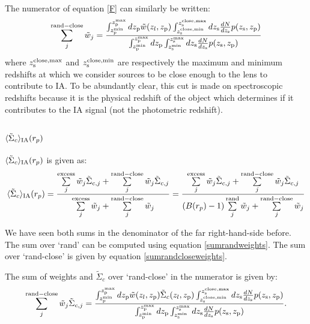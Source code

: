 \documentclass[onecolumn,amsmath,aps,fleqn, superscriptaddress]{revtex4}
\begin{document}
The numerator of equation \ref{F} can similarly be written:
\begin{equation}
\sum\limits_{j}^{\rm rand-close}\tilde{w}_j = \frac{\int_{z_{\rm p}^{\rm min}}^{z_{\rm p}^{\rm max}} d z_{\rm p} \tilde{w}(z_l, z_{\rm p}) \int_{z_{\rm s}^{\rm close, min}}^{z_{\rm s}^{\rm close, max}} dz_{\rm s} \frac{dN}{dz_{\rm s}} p(z_{\rm s}, z_{\rm p})}{\int_{z_{\rm p}^{\rm min}}^{z_{\rm p}^{\rm max}} d z_{\rm p} \int_{z_{\rm s}^{\rm min}}^{z_{\rm s}^{\rm max}} dz_{\rm s} \frac{dN}{dz_{\rm s}} p(z_{\rm s}, z_{\rm p})}
\label{sumrandcloseweights}
\end{equation}
where $z_{\rm s}^{\rm close,max}$ and $z_{\rm s}^{\rm close,min}$ are respectively the maximum and minimum redshifts at which we consider sources to be close enough to the lens to contribute to IA. To be abundantly clear, this cut is made on spectroscopic redshifts because it is the physical redshift of the object which determines if it contributes to the IA signal (not the photometric redshift). 

\subsection{$\langle \tilde{\Sigma}_c\rangle_{\rm IA}(r_p)$}

$\langle \tilde{\Sigma}_c\rangle_{\rm IA}(r_p)$ is given as:
\begin{equation}
\langle \tilde{\Sigma}_c\rangle_{\rm IA} (r_p) =  \frac{\sum\limits_{j}^{\rm excess} \tilde{w}_j \tilde{\Sigma}_{c,j}+ \sum\limits_{j}^{\rm rand-close} \tilde{w}_j \tilde{\Sigma}_{c,j}}{\sum\limits_{j}^{\rm excess} \tilde{w}_j + \sum\limits_{j}^{\rm rand-close} \tilde{w}_j}= \frac{\sum\limits_{j}^{\rm excess} \tilde{w}_j \tilde{\Sigma}_{c,j}+ \sum\limits_{j}^{\rm rand-close} \tilde{w}_j \tilde{\Sigma}_{c,j}}{(B(r_p)-1)\sum\limits_{j}^{\rm rand} \tilde{w}_j + \sum\limits_{j}^{\rm rand-close} \tilde{w}_j}
\label{SigmaIA}
\end{equation} 

We have seen both sums in the denominator of the far right-hand-side before. The sum over `rand' can be computed using equation \ref{sumrandweights}. The sum over `rand-close' is given by equation \ref{sumrandcloseweights}.

The sum of weights and $\tilde{\Sigma}_{c}$ over `rand-close' in the numerator is given by:
\begin{equation}
\sum\limits_{j}^{\rm rand-close} \tilde{w}_j \tilde{\Sigma}_{c,j} = \frac{\int_{z_{\rm p}^{\rm min}}^{z_{\rm p}^{\rm max}} d z_{\rm p} \tilde{w}(z_l, z_{\rm p})\tilde{\Sigma}_c(z_l, z_{\rm p}) \int_{z_{\rm s}^{\rm close, min}}^{z_{\rm s}^{\rm close, max}} dz_{\rm s} \frac{dN}{dz_{\rm s}} p(z_{\rm s}, z_{\rm p})}{\int_{z_{\rm p}^{\rm min}}^{z_{\rm p}^{\rm max}} d z_{\rm p} \int_{z_{\rm s}^{\rm min}}^{z_{\rm s}^{\rm max}} dz_{\rm s} \frac{dN}{dz_{\rm s}} p(z_{\rm s}, z_{\rm p})}.
\label{sumrandcloseweightsSigC}
\end{equation}
\end{document}
